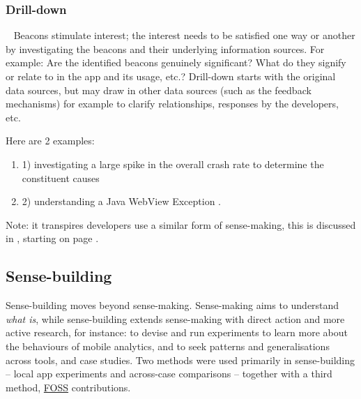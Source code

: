 \subsubsection{Drill-down}~\label{drill-down-research-method}
Beacons stimulate interest; the interest needs to be satisfied one way or another by investigating the beacons and their underlying information sources. 
For example:  Are the identified beacons genuinely significant? What do they signify or relate to in the app and its usage, etc.?  Drill-down starts with the original data sources, but may draw in other data sources (such as the feedback mechanisms) for example to clarify relationships, responses by the developers, etc.

Here are 2 examples:  %
\begin{enumerate}
    \itemsep0em
    \item 1) investigating a large spike in the overall crash rate to determine the constituent causes 
    \item 2) understanding a Java WebView Exception .
\end{enumerate}

Note: it transpires developers use a similar form of sense-making, this is discussed in , starting on page \pageref{sensemaking-and-decision-taking-by-developers-section}.

\clearpage

\clearpage

\subsection{Sense-building}
Sense-building moves beyond sense-making. Sense-making aims to understand \textit{what is}, while sense-building extends sense-making with direct action and more active research, for instance: to devise and run experiments to learn more about the behaviours of mobile analytics, and to seek patterns and generalisations across tools, and case studies. Two methods were used primarily in sense-building -- local app experiments and across-case comparisons -- together with a third method, \href{glossary-FOSS}{FOSS} contributions. 

